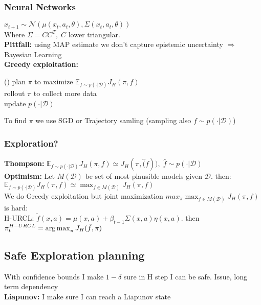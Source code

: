 \subsubsection{Neural Networks}
$x_{t+1} \sim \mathcal{N}(\mu(x_t, a_t, \theta), \Sigma(x_t, a_t, \theta))$\\
Where $\Sigma = CC^T,\; C$ lower triangular. \\
\textbf{Pittfall:} using MAP estimate we don't capture epistemic uncertainty $\Rightarrow$ Bayesian Learning\\
\textbf{Greedy exploitation:}\\
\begin{algorithm}[H]
    \Repeat(){}{
        plan $\pi$ to maximize $\mathbb{E}_{f\sim p(\cdot\vert \mathcal{D})}J_H(\pi,f)$\\
        rollout $\pi$ to collect more data\\
        update $p(\cdot\vert\mathcal{D})$
    }
\end{algorithm}
To find $\pi$ we use SGD or Trajectory samling (sampling also $f\sim p(\cdot\vert \mathcal{D})$) 

\subsubsection{Exploration?}
\textbf{Thompson:} {\scriptsize $ \mathbb{E}_{f\sim p(\cdot\vert \mathcal{D})}J_H(\pi,f) \simeq J_H(\pi,\hat(f)),\; \hat{f}\sim p(\cdot\vert \mathcal{D})$}\\
\textbf{Optimism:} Let $M(\mathcal{D})$ be set of most plausible models given $\mathcal{D}$. then:\\
$\mathbb{E}_{f\sim p(\cdot\vert \mathcal{D})}J_H(\pi,f) \simeq \max_{f\in M(\mathcal{D})} J_H(\pi,f)$\\
We do Greedy exploitation but joint maximization $max_\pi\max_{f\in M(\mathcal{D})} J_H(\pi,f)$ is hard: \\H-URCL: 
$\tilde{f}(x,a) = \mu(x,a)+\beta_{t-1}\Sigma (x,a)\eta(x,a)$.
then $\pi_t^{H-URCL}=\operatorname*{arg\,max}_\pi J_H(\tilde{f}, \pi)$

\subsection{Safe Exploration planning}
With confidence bounds I make $1-\delta$ sure in H step I can be safe. Issue, long term dependency\\
\textbf{Liapunov:} I make sure I can reach a Liapunov state












